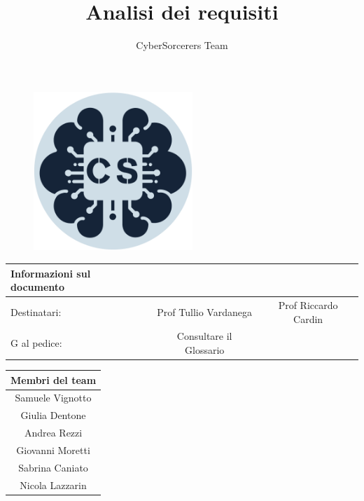 \documentclass{article}
\title{\Huge{\textbf{Analisi dei requisiti}}\vspace{-1em}}
\author{CyberSorcerers Team}
\date{}
\begin{document}
\maketitle

\vspace{-3em}
\begin{figure}[h]
  \centering
  \includegraphics[width=6cm, height=6cm]{documenti/logo rotondo.png}
  \label{fig:immagine}
\end{figure}

\vspace{6em}
\large{

\begin{center}
    \begin{tabular}{|l c c|}
    \hline
        \rowcolor{Blue} 
        \textbf{Informazioni sul documento} & &\\ [1 ex]
        \hline
        \rowcolor{LighterBlue}
        Destinatari: & Prof Tullio Vardanega & Prof Riccardo Cardin\\ [1 ex]
        \hline
        \rowcolor{LightBlue}
        G al pedice: & Consultare il Glossario & \\ [1 ex]
        \hline
    \end{tabular}
\end{center}}

\begin{table}[h]
\centering
\begin{tabular}{|c|}
\hline
\rowcolor{Blue}
\textbf{Membri del team} \\
\hline
\rowcolor{LighterBlue}
Samuele Vignotto \\
\hline
\rowcolor{LightBlue}
Giulia Dentone \\
\hline
\rowcolor{LighterBlue}
Andrea Rezzi \\
\hline
\rowcolor{LightBlue}
Giovanni Moretti \\
\hline
\rowcolor{LighterBlue}
Sabrina Caniato \\
\hline
\rowcolor{LightBlue}
Nicola Lazzarin \\
\hline
\end{tabular}
\end{table}
\end{document}
